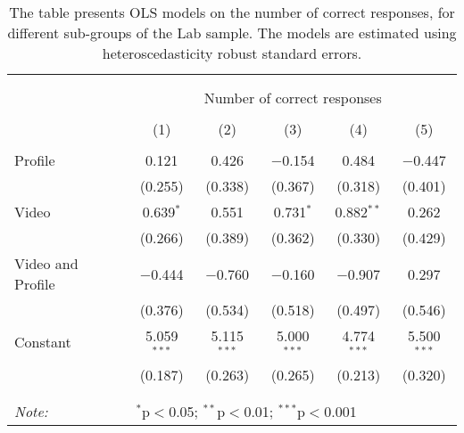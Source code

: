 
\begin{table}[H] \centering 
  \caption{The table presents OLS models on the number of correct responses, for different sub-groups of the Lab sample. The models are estimated
            using heteroscedasticity robust standard errors.} 
  \label{tbl:Main_results_CR_no_control_lab} 
\begin{tabular}{@{\extracolsep{5pt}}lccccc} 
\\[-1.8ex]\hline 
\hline \\[-1.8ex] 
\\[-1.8ex] & \multicolumn{5}{c}{Number of correct responses} \\ 
\\[-1.8ex] & (1) & (2) & (3) & (4) & (5)\\ 
\hline \\[-1.8ex] 
 Profile & 0.121 & 0.426 & $-$0.154 & 0.484 & $-$0.447 \\ 
  & (0.255) & (0.338) & (0.367) & (0.318) & (0.401) \\ 
  Video & 0.639$^{*}$ & 0.551 & 0.731$^{*}$ & 0.882$^{**}$ & 0.262 \\ 
  & (0.266) & (0.389) & (0.362) & (0.330) & (0.429) \\ 
  Video and Profile & $-$0.444 & $-$0.760 & $-$0.160 & $-$0.907 & 0.297 \\ 
  & (0.376) & (0.534) & (0.518) & (0.497) & (0.546) \\ 
  Constant & 5.059$^{***}$ & 5.115$^{***}$ & 5.000$^{***}$ & 4.774$^{***}$ & 5.500$^{***}$ \\ 
  & (0.187) & (0.263) & (0.265) & (0.213) & (0.320) \\ 
 \hline \\[-1.8ex] 
\hline 
\hline \\[-1.8ex] 
\textit{Note:}  & \multicolumn{5}{l}{$^{*}$p$<$0.05; $^{**}$p$<$0.01; $^{***}$p$<$0.001} \\ 
\end{tabular} 
\end{table} 
